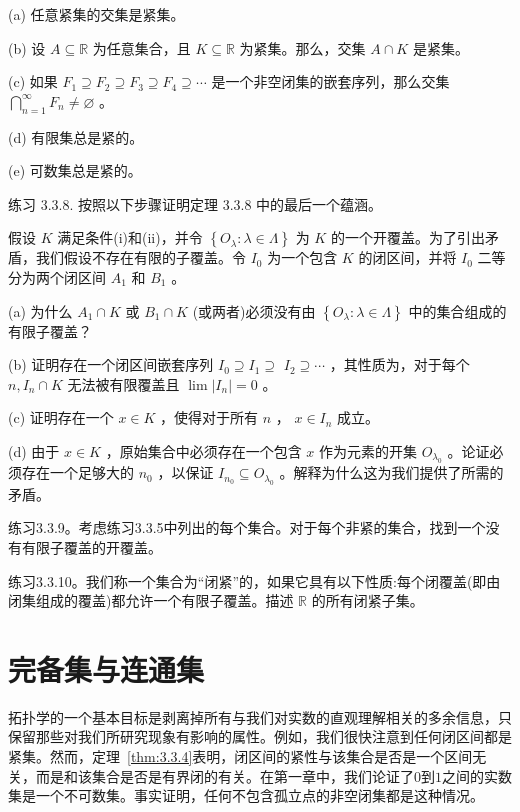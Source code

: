 (a) 任意紧集的交集是紧集。

(b) 设 \(A \subseteq  \mathbb{R}\) 为任意集合，且 \(K \subseteq  \mathbb{R}\) 为紧集。那么，交集 \(A \cap  K\) 是紧集。

(c) 如果 \({F}_{1} \supseteq  {F}_{2} \supseteq  {F}_{3} \supseteq  {F}_{4} \supseteq  \cdots\) 是一个非空闭集的嵌套序列，那么交集 \(\mathop{\bigcap }\limits_{{n = 1}}^{\infty }{F}_{n} \neq  \varnothing\) 。

(d) 有限集总是紧的。

(e) 可数集总是紧的。

练习 3.3.8. 按照以下步骤证明定理 3.3.8 中的最后一个蕴涵。

假设 \(K\) 满足条件(i)和(ii)，并令 \(\left\{  {{O}_{\lambda } : \lambda  \in  \Lambda }\right\}\) 为 \(K\) 的一个开覆盖。为了引出矛盾，我们假设不存在有限的子覆盖。令 \({I}_{0}\) 为一个包含 \(K\) 的闭区间，并将 \({I}_{0}\) 二等分为两个闭区间 \({A}_{1}\) 和 \({B}_{1}\) 。

(a) 为什么 \({A}_{1} \cap  K\) 或 \({B}_{1} \cap  K\) (或两者)必须没有由 \(\left\{  {{O}_{\lambda } : \lambda  \in  \Lambda }\right\}\) 中的集合组成的有限子覆盖？

(b) 证明存在一个闭区间嵌套序列 \({I}_{0} \supseteq  {I}_{1} \supseteq\)  \({I}_{2} \supseteq  \cdots\) ，其性质为，对于每个 \(n,{I}_{n} \cap  K\) 无法被有限覆盖且 \(\lim \left| {I}_{n}\right|  = 0\) 。

(c) 证明存在一个 \(x \in  K\) ，使得对于所有 \(n\) ， \(x \in  {I}_{n}\) 成立。

(d) 由于 \(x \in  K\) ，原始集合中必须存在一个包含 \(x\) 作为元素的开集 \({O}_{{\lambda }_{0}}\) 。论证必须存在一个足够大的 \({n}_{0}\) ，以保证 \({I}_{{n}_{0}} \subseteq  {O}_{{\lambda }_{0}}\) 。解释为什么这为我们提供了所需的矛盾。

练习3.3.9。考虑练习3.3.5中列出的每个集合。对于每个非紧的集合，找到一个没有有限子覆盖的开覆盖。

练习3.3.10。我们称一个集合为“闭紧”的，如果它具有以下性质:每个闭覆盖(即由闭集组成的覆盖)都允许一个有限子覆盖。描述 \(\mathbb{R}\) 的所有闭紧子集。

\section{完备集与连通集}
\label{sec:3.4}
拓扑学的一个基本目标是剥离掉所有与我们对实数的直观理解相关的多余信息，只保留那些对我们所研究现象有影响的属性。例如，我们很快注意到任何闭区间都是紧集。然而，定理~\ref{thm:3.3.4}表明，闭区间的紧性与该集合是否是一个区间无关，而是和该集合是否是有界闭的有关。在第一章中，我们论证了$0$到$1$之间的实数集是一个不可数集。事实证明，任何不包含孤立点的非空闭集都是这种情况。


